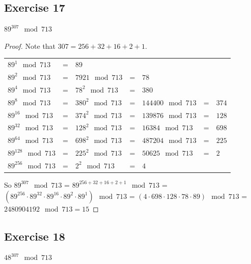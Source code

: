 \documentclass[14pt]{extarticle}
\begin{document}
\subsection{Exercise 17}
\(89^{307} \mod 713\)

\begin{proof}
        Note that \(307 = 256 + 32 + 16 + 2 + 1\).

        \begin{tabular}{lclclcl}
                \(89^1 \mod 713\)     & = & \(89\)                                                     \\
                \(89^2 \mod 713\)     & = & \(7921 \mod 713\)  & = & \(78\)                            \\
                \(89^4 \mod 713\)     & = & \(78^2 \mod 713\)  & = & \(380\)                           \\
                \(89^8 \mod 713\)     & = & \(380^2 \mod 713\) & = & \(144400 \mod 713\) & = & \(374\) \\
                \(89^{16} \mod 713\)  & = & \(374^2 \mod 713\) & = & \(139876 \mod 713\) & = & \(128\) \\
                \(89^{32} \mod 713\)  & = & \(128^2 \mod 713\) & = & \(16384 \mod 713\)  & = & \(698\) \\
                \(89^{64} \mod 713\)  & = & \(698^2 \mod 713\) & = & \(487204 \mod 713\) & = & \(225\) \\
                \(89^{128} \mod 713\) & = & \(225^2 \mod 713\) & = & \(50625 \mod 713\)  & = & \(2\)   \\
                \(89^{256} \mod 713\) & = & \(2^2 \mod 713\)   & = & \(4\)
        \end{tabular}

        So \(89^{307} \mod 713\) = \(89^{256 + 32 + 16 + 2 + 1} \mod 713\) = \((89^{256} \cdot 89^{32} \cdot 89^{16}
        \cdot 89^{2} \cdot 89^{1}) \mod 713\) = \((4 \cdot 698 \cdot 128 \cdot 78 \cdot 89) \mod 713\) = \(2480904192 \mod
        713 = 15\)
\end{proof}

\subsection{Exercise 18}
\(48^{307} \mod 713\)
\end{document}
